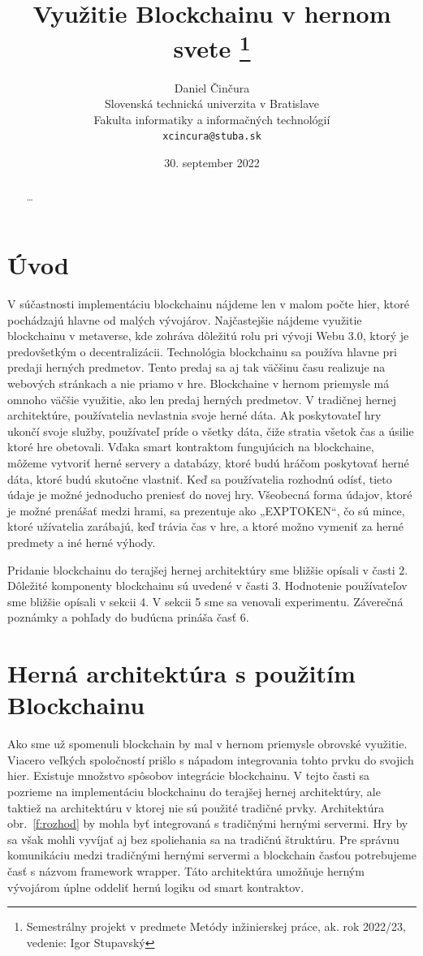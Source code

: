 \documentclass[10pt,twoside,slovak,a4paper]{article}
\title{Využitie Blockchainu v hernom svete
\thanks{Semestrálny projekt v predmete Metódy inžinierskej práce, ak. rok 2022/23, vedenie: Igor Stupavský}}
\author{Daniel Činčura\\[2pt]
	{\small Slovenská technická univerzita v Bratislave}\\
	{\small Fakulta informatiky a informačných technológií}\\
	{\small \texttt{xcincura@stuba.sk}}
	}
\date{\small 30. september 2022}
\begin{document}
\maketitle

\begin{abstract}
\ldots
\end{abstract}



\section{Úvod}

V súčastnosti implementáciu blockchainu nájdeme len v malom počte hier, ktoré pochádzajú hlavne od malých vývojárov. Najčastejšie nájdeme využitie blockchainu v metaverse, kde zohráva dôležitú rolu pri vývoji Webu 3.0, ktorý je predovšetkým o decentralizácii. Technológia blockchainu sa používa hlavne pri predaji herných predmetov. Tento predaj sa aj tak väčšinu času realizuje na webových stránkach a nie priamo v hre. Blockchaine v hernom priemysle má omnoho väčšie využitie, ako len predaj herných predmetov.
V tradičnej hernej architektúre, používatelia nevlastnia svoje herné dáta. Ak poskytovateľ hry ukončí svoje služby, používateľ príde o všetky dáta, čiže stratia všetok čas a úsilie ktoré hre obetovali. Vďaka smart kontraktom fungujúcich na blockchaine, môžeme vytvoriť herné servery a databázy, ktoré budú hráčom poskytovať herné dáta, ktoré budú skutočne vlastniť. Keď sa používatelia rozhodnú odísť, tieto údaje je možné jednoducho preniesť do novej hry. Všeobecná forma údajov, ktoré je možné prenášať medzi hrami, sa prezentuje ako „EXPTOKEN“, čo sú mince, ktoré užívatelia zarábajú, keď trávia čas v hre, a ktoré možno vymeniť za herné predmety a iné herné výhody.

Pridanie blockchainu do terajšej hernej architektúry sme bližšie opísali v časti 2. Dôležité komponenty blockchainu sú uvedené v časti 3. Hodnotenie používateľov sme bližšie opísali v sekcii 4. V sekcii 5 sme sa venovali experimentu. Záverečná poznámky a pohľady do budúcna prináša časť 6.




\section{Herná architektúra s použitím Blockchainu} \label{nejaka}

Ako sme už spomenuli blockchain by mal v hernom priemysle obrovské využitie. Viacero veľkých spoločností prišlo s nápadom integrovania tohto prvku do svojich hier. Existuje množstvo spôsobov integrácie blockchainu. V tejto časti sa pozrieme na implementáciu blockchainu do terajšej hernej architektúry, ale taktiež na architektúru v ktorej nie sú použité tradičné prvky. Architektúra obr.~\ref{f:rozhod} by mohla byť integrovaná s tradičnými hernými servermi. Hry by sa však mohli vyvíjať aj bez spoliehania sa na tradičnú štruktúru. Pre správnu komunikáciu medzi tradičnými hernými servermi a blockchain časťou potrebujeme časť s názvom framework wrapper. Táto architektúra umožňuje herným vývojárom úplne oddeliť hernú logiku od smart kontraktov.
\end{document}

